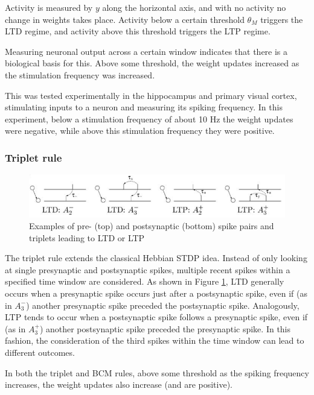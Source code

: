 \documentclass[main]{subfiles}
\begin{document}
Activity is measured by $y$ along the horizontal axis, and with no activity no change in weights takes place. Activity below a certain threshold $\theta_M$ triggers the LTD regime, and activity above this threshold triggers the LTP regime.

Measuring neuronal output across a certain window indicates that there is a biological basis for this. Above some threshold, the weight updates increased as the stimulation frequency was increased.

This was tested experimentally in the hippocampus and primary visual cortex, stimulating inputs to a neuron and measuring its spiking frequency. In this experiment, below a stimulation frequency of about 10 Hz the weight updates were negative, while above this stimulation frequency they were positive.

\subsubsection{Triplet rule}

\begin{figure}[H]
		\centering
		\includegraphics[width=\linewidth]{04_LearningRules/figures/4_4_triplet.png}
		\caption{Examples of pre- (top) and postsynaptic (bottom) spike pairs and triplets leading to LTD or LTP}
		\label{fig:4_triplet}
	\end{figure}

The triplet rule extends the classical Hebbian STDP idea. Instead of only looking at single presynaptic and postsynaptic spikes, multiple recent spikes within a specified time window are considered. As shown in Figure \ref{fig:4_triplet}, LTD generally occurs when a presynaptic spike occurs just after a postsynaptic spike, even if (as in $A^-_3$) another presynaptic spike preceded the postsynaptic spike. Analogously, LTP tends to occur when a postsynaptic spike follows a presynaptic spike, even if (as in $A^+_3$) another postsynaptic spike preceded the presynaptic spike. In this fashion, the consideration of the third spikes within the time window can lead to different outcomes.

In both the triplet and BCM rules, above some threshold as the spiking frequency increases, the weight updates also increase (and are positive).
\end{document}
